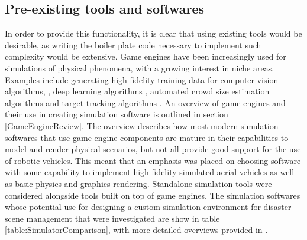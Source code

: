 \subsection{Pre-existing tools and softwares}
In order to provide this functionality, it is clear that using existing tools would be desirable, as writing the boiler plate code necessary to implement such complexity would be extensive. Game engines have been increasingly used for simulations of physical phenomena, with a growing interest in niche areas. Examples include generating high-fidelity training data for computer vision algorithms, \cite{QiuUnrealCV:Engine}, deep learning algorithms \cite{GaidonVirtualAnalysis}, automated crowd size estimation algorithms \cite{Lee2018DigitalCrowds} and target tracking algorithms \cite{Mueller2016ATracking}. An overview of game engines and their use in creating simulation software is outlined in section \ref{GameEngineReview}. The overview describes how most modern simulation softwares that use game engine components are mature in their capabilities to model and render physical scenarios, but not all provide good support for the use of robotic vehicles.
This meant that an emphasis was placed on choosing software with some capability to implement high-fidelity simulated aerial vehicles as well as basic physics and graphics rendering.
Standalone simulation tools were considered alongside tools built on top of game engines. The simulation softwares whose potential use for designing a custom simulation environment for disaster scene management that were investigated are show in table \ref{table:SimulatorComparison}, with more detailed overviews provided in \cite{Ebeid2018ASimulators}.

